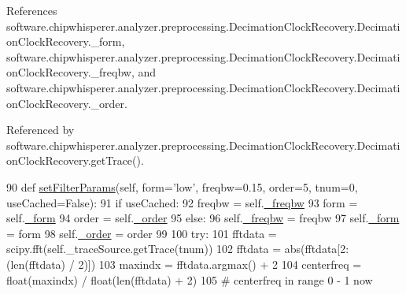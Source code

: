 References software.\+chipwhisperer.\+analyzer.\+preprocessing.\+Decimation\+Clock\+Recovery.\+Decimation\+Clock\+Recovery.\+\_\+form, software.\+chipwhisperer.\+analyzer.\+preprocessing.\+Decimation\+Clock\+Recovery.\+Decimation\+Clock\+Recovery.\+\_\+freqbw, and software.\+chipwhisperer.\+analyzer.\+preprocessing.\+Decimation\+Clock\+Recovery.\+Decimation\+Clock\+Recovery.\+\_\+order.



Referenced by software.\+chipwhisperer.\+analyzer.\+preprocessing.\+Decimation\+Clock\+Recovery.\+Decimation\+Clock\+Recovery.\+get\+Trace().


\begin{DoxyCode}
90     \textcolor{keyword}{def }\hyperlink{classsoftware_1_1chipwhisperer_1_1analyzer_1_1preprocessing_1_1DecimationClockRecovery_1_1DecimationClockRecovery_a7750a3577e1f40ee33c93e2fc346efe1}{setFilterParams}(self, form='low', freqbw=0.15, order=5, tnum=0, useCached=False):
91         \textcolor{keywordflow}{if} useCached:
92             freqbw = self.\hyperlink{classsoftware_1_1chipwhisperer_1_1analyzer_1_1preprocessing_1_1DecimationClockRecovery_1_1DecimationClockRecovery_afd1d4b5f98a0640b9c0ccce7d07ea3f3}{\_freqbw}
93             form = self.\hyperlink{classsoftware_1_1chipwhisperer_1_1analyzer_1_1preprocessing_1_1DecimationClockRecovery_1_1DecimationClockRecovery_ae547aacf49d5e8d4e142d801dd4a88e5}{\_form}
94             order = self.\hyperlink{classsoftware_1_1chipwhisperer_1_1analyzer_1_1preprocessing_1_1DecimationClockRecovery_1_1DecimationClockRecovery_aaa1d886a591c0d2a6979d5ab3e79df6d}{\_order}
95         \textcolor{keywordflow}{else}:
96             self.\hyperlink{classsoftware_1_1chipwhisperer_1_1analyzer_1_1preprocessing_1_1DecimationClockRecovery_1_1DecimationClockRecovery_afd1d4b5f98a0640b9c0ccce7d07ea3f3}{\_freqbw} = freqbw
97             self.\hyperlink{classsoftware_1_1chipwhisperer_1_1analyzer_1_1preprocessing_1_1DecimationClockRecovery_1_1DecimationClockRecovery_ae547aacf49d5e8d4e142d801dd4a88e5}{\_form} = form
98             self.\hyperlink{classsoftware_1_1chipwhisperer_1_1analyzer_1_1preprocessing_1_1DecimationClockRecovery_1_1DecimationClockRecovery_aaa1d886a591c0d2a6979d5ab3e79df6d}{\_order} = order
99 
100         \textcolor{keywordflow}{try}:
101             fftdata = scipy.fft(self.\_traceSource.getTrace(tnum))
102             fftdata = abs(fftdata[2:(len(fftdata) / 2)])
103             maxindx = fftdata.argmax() + 2
104             centerfreq = float(maxindx) / float(len(fftdata) + 2)
105             \textcolor{comment}{# centerfreq in range 0 - 1 now}

\end{DoxyCode}
